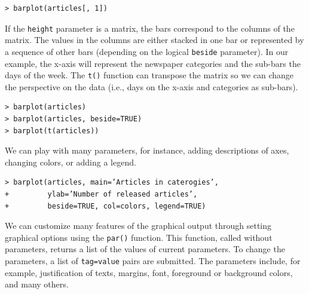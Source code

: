 \begin{verbatim}
> barplot(articles[, 1])
\end{verbatim}

If the \texttt{height} parameter is a matrix, the bars correspond to the columns of
the matrix. The values in the columns are either stacked in one bar or represented
by a sequence of other bars (depending on the logical \texttt{beside} parameter). 
In our example, the x-axis will represent the newspaper categories and the sub-bars the
days of the week. The \texttt{t()} function can transpose the matrix so we can change
the perspective on the data (i.e., days on the x-axis and categories as sub-bars).

\begin{verbatim}
> barplot(articles)
> barplot(articles, beside=TRUE)
> barplot(t(articles))
\end{verbatim}

We can play with many parameters, for instance, adding descriptions of axes,
changing colors, or adding a legend.

\begin{verbatim}
> barplot(articles, main=’Articles in caterogies’,
+         ylab=’Number of released articles’,
+         beside=TRUE, col=colors, legend=TRUE)
\end{verbatim}  

We can customize many features of the graphical output through setting
graphical options using the \texttt{par()} function. This function, called without parameters,
returns a list of the values of current parameters. To change the parameters,
a list of \texttt{tag=value} pairs are submitted. The parameters include, for example,
justification of texts, margins, font, foreground or background colors, and many
others.














    












